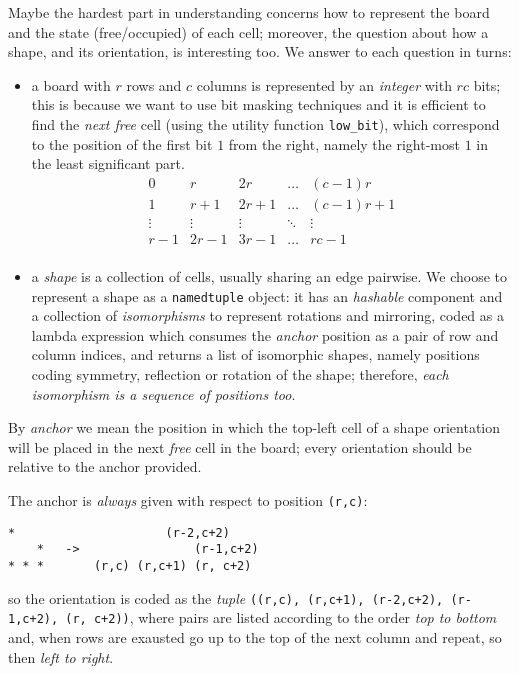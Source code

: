 Maybe the hardest part in understanding concerns how to represent the board and
the state (free/occupied) of each cell; moreover, the question about how a
shape, and its orientation, is interesting too. We answer to each question in
turns:
\begin{itemize}
    \item a board with $r$ rows and $c$ columns is represented by an
    \textit{integer} with $rc$ bits; this is because we want to use bit masking
    techniques and it is efficient to find the \textit{next free} cell (using
    the utility function \verb|low_bit|), which correspond to the position of
    the first bit $1$ from the right, namely the right-most $1$ in the least
    significant part.
    \begin{displaymath}
    \begin{array}{c|c|c|c|c}
    0 & r & 2r & \ldots & (c-1)r \\
    \hline
    1 & r+1 & 2r+1 & \ldots & (c-1)r+1 \\
    \hline
    \vdots & \vdots & \vdots & \ddots & \vdots \\
    \hline
    r-1 & 2r-1 & 3r-1 & \ldots & rc-1\\
    \end{array}
    \end{displaymath}

    \item a \textit{shape} is a collection of cells, usually sharing an edge
    pairwise. We choose to represent a shape as a \verb|namedtuple| object: it
    has an \textit{hashable} component and a collection of
    \textit{isomorphisms} to represent rotations and mirroring, coded as a
    lambda expression which consumes the \textit{anchor} position as a pair of row
    and column indices, and returns a list of isomorphic shapes, namely
    positions coding symmetry, reflection or rotation of the shape; therefore,
    \textit{each isomorphism is a sequence of positions too}.
\end{itemize}
By \textit{anchor} we mean the position in which the top-left cell of a shape
orientation will be placed in the next \textit{free} cell in the board; every
orientation should be relative to the anchor provided.

The anchor is \textit{always} given with respect to position \verb|(r,c)|:
\begin{Verbatim}[baselinestretch=0.1, fontsize=\small]
    *                     (r-2,c+2)
    *   ->                (r-1,c+2)
* * *       (r,c) (r,c+1) (r, c+2)
\end{Verbatim}
so the orientation is coded as the \textit{tuple}
\verb|((r,c), (r,c+1), (r-2,c+2), (r-1,c+2), (r, c+2))|,
where pairs are listed according to the order \textit{top to bottom} and,
when rows are exausted go up to the top of the next column and repeat, so then
\textit{left to right}.



